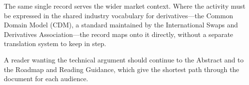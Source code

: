 The same single record serves the wider market context. Where the activity must be
expressed in the shared industry vocabulary for derivatives---the Common Domain Model
(CDM), a standard maintained by the International Swaps and Derivatives Association---the
record maps onto it directly, without a separate translation system to keep in step.

A reader wanting the technical argument should continue to the Abstract and to the Roadmap
and Reading Guidance, which give the shortest path through the document for each audience.
